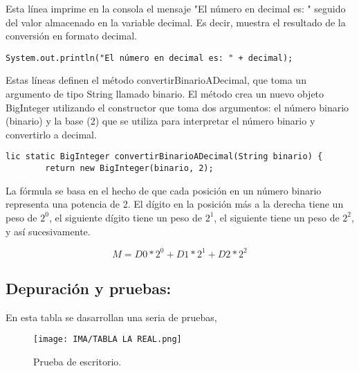  Esta línea imprime en la consola el mensaje "El número en decimal es: " seguido del valor almacenado en la variable decimal. Es decir, muestra el resultado de la conversión en formato decimal.

\begin{lstlisting}[style=javaStyle]
System.out.println("El número en decimal es: " + decimal);

\end{lstlisting}

Estas líneas definen el método convertirBinarioADecimal, que toma un argumento de tipo String llamado binario. El método crea un nuevo objeto BigInteger utilizando el constructor que toma dos argumentos: el número binario (binario) y la base (2) que se utiliza para interpretar el número binario y convertirlo a decimal. 

\begin{lstlisting}[style=javaStyle]
lic static BigInteger convertirBinarioADecimal(String binario) {
        return new BigInteger(binario, 2);

\end{lstlisting}

\text La fórmula se basa en el hecho de que cada posición en un número binario representa una potencia de 2. El dígito en la posición más a la derecha tiene un peso de \(2^0\), el siguiente dígito tiene un peso de \(2^1\), el siguiente tiene un peso de \(2^2\), y así sucesivamente.
\space

\begin{equation}

M = D0 * 2^0 + D1 * 2^1 + D2 * 2^2

\end{equation}


\subsection{\textbf{Depuración y pruebas:}}
En esta tabla se dasarrollan una seria de pruebas, 
\begin{figure}[H]
    \centering
    \texttt{[image: IMA/TABLA LA REAL.png]}
    \caption{Prueba de escritorio.}
\end{figure}
